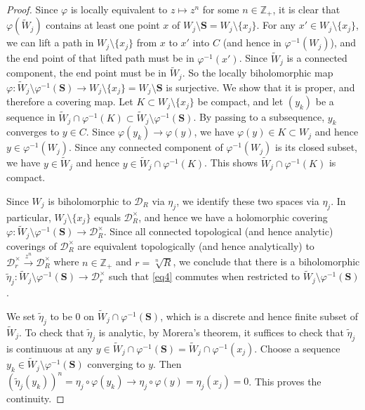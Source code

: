 \documentclass[12pt,a4paper,notitlepage]{article}
\theoremstyle{definition}
\theoremstyle{plain}
\newcommand{\mc}{\mathcal}
\newcommand{\wtd}{\widetilde}
\newcommand{\Zbb}{\mathbb Z}
\newcommand{\Sbf}{\mathbf{S}}
\numberwithin{equation}{subsection}
\begin{document}
\begin{proof}
Since $\varphi$ is locally equivalent to $z\mapsto z^n$ for some $n\in\Zbb_+$, it is clear that $\varphi(\wtd W_j)$ contains at least one point $x$ of $W_j\setminus\Sbf=W_j\setminus\{x_j\}$. For any $x'\in W_j\setminus\{x_j\}$, we can lift a path in $W_j\setminus\{x_j\}$ from $x$ to $x'$ into $C$ (and hence in $\varphi^{-1}(W_j)$), and the end point of that lifted path must be in $\varphi^{-1}(x')$. Since $\wtd W_j$ is a connected component,  the end point must be in $\wtd W_j$. So the locally biholomorphic map $\varphi:\wtd W_j\setminus\varphi^{-1}(\Sbf)\rightarrow W_j\setminus\{x_j\}=W_j\setminus\Sbf$ is surjective. We show that it is proper, and therefore  a covering map. Let $K\subset W_j\setminus\{x_j\}$ be compact, and let $(y_k)$ be a sequence in $\wtd W_j\cap\varphi^{-1}(K)\subset\wtd W_j\setminus\varphi^{-1}(\Sbf)$. By passing to a subsequence, $y_k$ converges to $y\in C$. Since $\varphi(y_k)\rightarrow \varphi(y)$, we have $\varphi(y)\in K\subset W_j$ and hence $y\in\varphi^{-1}(W_j)$. Since any connected component of $\varphi^{-1}(W_j)$ is its closed subset, we have $y\in\wtd W_j$ and hence $y\in\wtd W_j\cap\varphi^{-1}(K)$. This shows $\wtd W_j\cap\varphi^{-1}(K)$ is compact. 

Since $W_j$  is biholomorphic to $\mc D_R$ via $\eta_j$, we identify these two spaces via $\eta_j$. In particular, $W_j\setminus\{x_j\}$ equals $\mc D_R^\times$, and hence we have a holomorphic covering $\varphi:\wtd W_j\setminus\varphi^{-1}(\Sbf)\rightarrow\mc D_R^\times$. Since all connected topological (and hence  analytic) coverings of $\mc D_R^\times$ are equivalent topologically (and hence analytically) to $\mc D_r^\times\xrightarrow{z^n}\mc D_R^\times$ where $n\in\Zbb_+$ and $r=\sqrt[n]{R}$, we conclude that there is a biholomorphic $\wtd\eta_j:\wtd W_j\setminus\varphi^{-1}(\Sbf)\rightarrow\mc D_r^\times$ such that \eqref{eq4} commutes when restricted to $\wtd W_j\setminus\varphi^{-1}(\Sbf)$. 

We set $\wtd\eta_j$ to be $0$ on $\wtd W_j\cap\varphi^{-1}(\Sbf)$, which is a discrete and hence finite subset of $\wtd W_j$. To check that $\wtd\eta_j$ is analytic, by Morera's theorem, it suffices to check that $\wtd\eta_j$ is continuous at any $y\in\wtd W_j\cap\varphi^{-1}(\Sbf)=\wtd W_j\cap\varphi^{-1}(x_j)$. Choose a sequence $y_k\in\wtd W_j\setminus\varphi^{-1}(\Sbf)$ converging to $y$. Then $(\wtd\eta_j(y_k))^n=\eta_j\circ\varphi(y_k)\rightarrow\eta_j\circ\varphi(y)=\eta_j(x_j)=0$. This proves the continuity. 


\end{proof}
\end{document}
